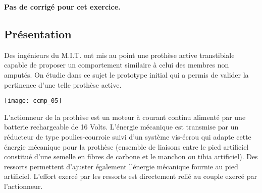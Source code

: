 \normaltrue \difficilefalse \tdifficilefalse
\correctiontrue




\setcounter{numques}{0}
\ifcorrection
\else
\textbf{Pas de corrigé pour cet exercice.}
\fi




\subsection*{Présentation}

\ifprof
\else
Des ingénieurs du M.I.T. ont mis au point une prothèse active transtibiale capable de proposer un comportement
similaire à celui des membres non amputés. On étudie dans ce sujet le prototype initial
qui a permis de valider la pertinence d'une telle prothèse active.


\begin{center}
\texttt{[image: ccmp\_05]}

\end{center}



L'actionneur de la prothèse est un moteur à courant
continu alimenté par une batterie rechargeable de 16
Volts. L'énergie mécanique est transmise par un
réducteur de type poulies-courroie suivi d'un
système vis-écrou qui adapte cette énergie
mécanique pour la prothèse (ensemble de liaisons
entre le pied artificiel constitué d'une semelle en
fibres de carbone et le manchon ou tibia artificiel).
Des ressorts permettent d'ajuster également l'énergie
mécanique fournie au pied artificiel. L'effort exercé
par les ressorts est directement relié au couple
exercé par l'actionneur.

